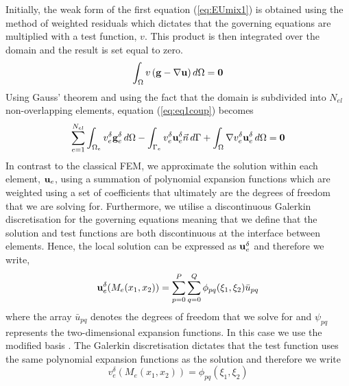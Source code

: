 \documentclass[review]{elsarticle}
\begin{document}
\par Initially, the weak form of the first equation (\ref{eq:EUmix1}) is obtained using the method of weighted residuals which dictates that the governing equations are multiplied with a test function, $v$. This product is then integrated over the domain and the result is set equal to zero. 
\begin{equation}\label{eq:eq1coup}
\int_{\Omega}{v} \left({\bf g}-\nabla{\bf u}\right) d\Omega= \bf 0
\end{equation}
Using Gauss' theorem and using the fact that the domain is subdivided into $N_{el}$ non-overlapping elements, equation (\ref{eq:eq1coup}) becomes
\begin{equation}\label{eq:eq1coupled}
\sum_{e=1}^{N_{el}}\int_{\Omega_e}{v^\delta_e} {{{\bf g}}}^\delta_e \, d\Omega-\int_{\Gamma_e}{v^\delta_e}{\bf u}^\delta_e  \vec{n}\, d\Gamma + \int_{\Omega} \nabla {v}^\delta_e {\bf u}^\delta_e \, d\Omega= \bf 0
\end{equation}
In contrast to the classical FEM, we approximate the solution within each element, ${\bf u}_e$, using a summation of polynomial expansion functions which are weighted using a set of coefficients that ultimately are the degrees of freedom that we are solving for. Furthermore, we utilise a discontinuous Galerkin discretisation for the governing equations meaning that we define that the solution and test functions are both discontinuous at the interface between elements. 
Hence, the local solution can be expressed as ${{\bf u}}^\delta_e$ and therefore we write,
\begin{equation}\label{eq:sol}
{{\bf u}}^\delta_e(M_e(x_1,x_2))=\sum_{p=0}^{P}\sum_{q=0}^{Q}\phi_{pq}({\xi_1},{\xi_2})\bar{u}_{pq}
\end{equation}
where the array $\bar{u}_{pq}$ denotes the degrees of freedom that we solve for and $\psi_{pq}$ represents the two-dimensional expansion functions. In this case we use the modified basis \cite{BookSpencer}.
The Galerkin discretisation dictates that the test function uses the same polynomial expansion functions as the solution and therefore we write
\begin{equation}\label{eq:test}
v_e^\delta(M_e(x_1,x_2)) = \phi_{pq}({\xi_1},{\xi_2})
\end{equation}
\end{document}
